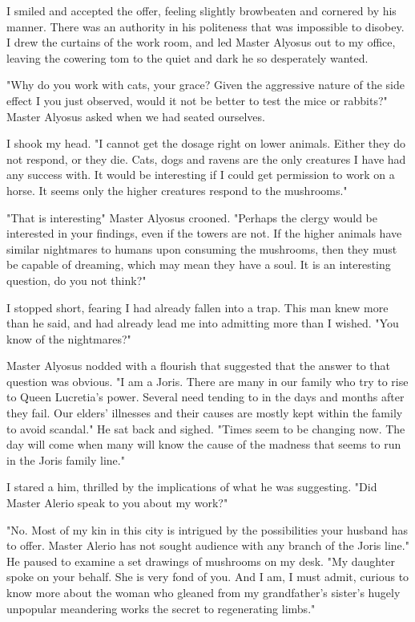 \documentclass{article}
\begin{document}
I smiled and accepted the offer, feeling slightly browbeaten and cornered by his manner. There was an authority in his politeness that was impossible to disobey. I drew the curtains of the work room, and led Master Alyosus out to my office, leaving the cowering tom to the quiet and dark he so desperately wanted. 

"Why do you work with cats, your grace? Given the aggressive nature of the side effect I you just observed, would it not be better to test the mice or rabbits?" Master Alyosus asked when we had seated ourselves.

I shook my head. "I cannot get the dosage right on lower animals. Either they do not respond, or they die. Cats, dogs and ravens are the only creatures I have had any success with. It would be interesting if I could get permission to work on a horse. It seems only the higher creatures respond to the mushrooms."

"That is interesting" Master Alyosus crooned. "Perhaps the clergy would be interested in your findings, even if the towers are not. If the higher animals have similar nightmares to humans upon consuming the mushrooms, then they must be capable of dreaming, which may mean they have a soul. It is an interesting question, do you not think?"

I stopped short, fearing I had already fallen into a trap. This man knew more than he said, and had already lead me into admitting more than I wished. "You know of the nightmares?"

Master Alyosus nodded with a flourish that suggested that the answer to that question was obvious. "I am a Joris. There are many in our family who try to rise to Queen Lucretia's power. Several need tending to in the days and months after they fail. Our elders' illnesses and their causes are mostly kept within the family to avoid scandal." He sat back and sighed. "Times seem to be changing now. The day will come when many will know the cause of the madness that seems to run in the Joris family line."

I stared a him, thrilled by the implications of what he was suggesting. "Did Master Alerio speak to you about my work?"

"No. Most of my kin in this city is intrigued by the possibilities your husband has to offer. Master Alerio has not sought audience with any branch of the Joris line." He paused to examine a set drawings of mushrooms on my desk. "My daughter spoke on your behalf. She is very fond of you. And I am, I must admit, curious to know more about the woman who gleaned from my grandfather's sister's hugely unpopular meandering works the secret to regenerating limbs."
\end{document}
